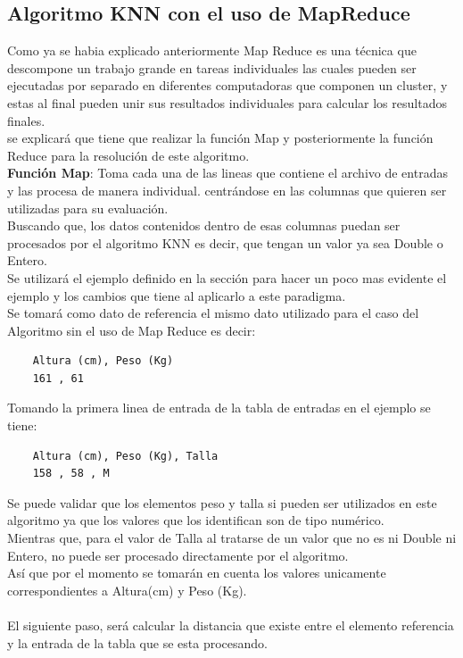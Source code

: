 \subsection{Algoritmo KNN con el uso de MapReduce}
Como ya se habia explicado anteriormente Map Reduce es una técnica que descompone un trabajo grande en tareas individuales las cuales pueden ser ejecutadas por separado en diferentes computadoras que componen un cluster, y estas al final pueden unir sus resultados individuales para calcular los resultados finales.\\
se explicará que tiene que realizar la función Map y posteriormente la función Reduce para la resolución de este algoritmo.
\\
\textbf{Función Map}: Toma cada una de las lineas que contiene el archivo de entradas y las procesa de manera individual. centrándose en las columnas que quieren ser utilizadas para su evaluación.\\
Buscando que, los datos contenidos dentro de esas columnas puedan ser procesados por el algoritmo KNN es decir, que tengan un valor ya sea Double o Entero. \\
Se utilizará el ejemplo definido en la sección  para hacer un poco mas evidente el ejemplo y los cambios que tiene al aplicarlo a este paradigma.\\
Se tomará como dato de referencia el mismo dato utilizado para el caso del Algoritmo sin el uso de Map Reduce es decir:
\begin{lstlisting} 
	Altura (cm), Peso (Kg)
	161 , 61 
\end{lstlisting}
Tomando la primera linea de entrada de la tabla de entradas en el ejemplo se tiene:\\ 
\begin{lstlisting} 
	Altura (cm), Peso (Kg), Talla
	158 , 58 , M
\end{lstlisting} 
Se puede validar que los elementos peso y talla si pueden ser utilizados en este algoritmo ya que los valores que los identifican son de tipo numérico. 
\\
Mientras que, para el valor de Talla al tratarse de un valor que no es ni Double ni Entero, no puede ser procesado directamente por el algoritmo. 
\\
Así que por el momento se tomarán en cuenta los valores unicamente correspondientes a Altura(cm) y Peso (Kg).\\
\\
El siguiente paso, será calcular la distancia que existe entre el elemento referencia y la entrada de la tabla que se esta procesando. \\
